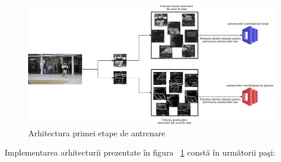 \documentclass[a4paper,12pt]{report}
\begin{document}
\begin{figure}[h]
\begin{center}
        \includegraphics[width=1\textwidth]{images/training_stage1_architecture}
			 \caption{Arhitectura primei etape de antrenare}
			 \label{fig:stage1_architecture}
\end{center}
\end{figure}
\clearpage
\par
Implementarea arhitecturii prezentate în figura ~\ref{fig:stage1_architecture} constă în următorii paşi:
\end{document}
